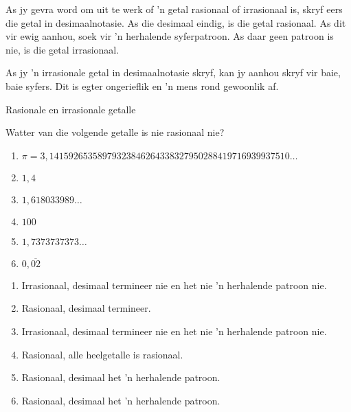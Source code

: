 \par
As jy gevra word om uit te werk of ’n getal rasionaal of irrasionaal is, skryf eers die getal in desimaalnotasie. As die desimaal eindig, is die getal rasionaal. As dit vir ewig aanhou, soek vir ’n herhalende syferpatroon. As daar geen patroon is nie, is die getal irrasionaal.
\par 
As jy ’n irrasionale getal in desimaalnotasie skryf, kan jy aanhou skryf vir baie, baie
syfers. Dit is egter ongerieflik en ’n mens rond gewoonlik af.\par
\clearpage
\begin{wex}{Rasionale en irrasionale getalle}
{
\begin{minipage}{\textwidth}
Watter van die volgende getalle is nie rasionaal nie?\\

\begin{enumerate}[itemsep=5pt, label=\textbf{\arabic*}. ] 
\item $\pi =3,14159265358979323846264338327950288419716939937510\ldots$
\item $1,4$
\item $1,618033989\ldots$
\item $100$
\item $1,7373737373\ldots$
\item $0,\overline{02}$
\end{enumerate}
\end{minipage}
}
{
\begin{minipage}{\textwidth}
\begin{enumerate}[itemsep=5pt, label=\textbf{\arabic*}. ] 
\item Irrasionaal, desimaal termineer nie en het nie 'n herhalende patroon nie. 
\item Rasionaal, desimaal termineer.
\item Irrasionaal, desimaal termineer nie en het nie 'n herhalende patroon nie. 
\item Rasionaal, alle heelgetalle is rasionaal.
\item Rasionaal, desimaal het 'n herhalende patroon.
\item Rasionaal, desimaal het 'n herhalende patroon.
\end{enumerate}
\end{minipage}
}
\end{wex}

